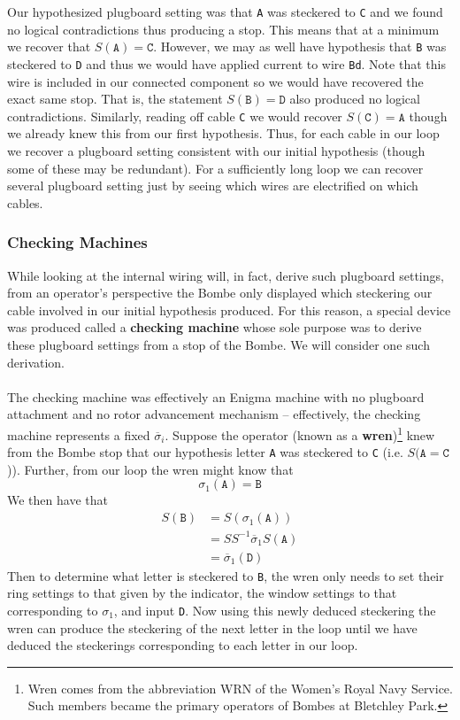 Our hypothesized plugboard setting was that \texttt{A} was steckered to \texttt{C} and we found no logical contradictions thus producing a stop. This means that at a minimum we recover that $S(\texttt{A}) = \texttt{C}$. However, we may as well have hypothesis that \texttt{B} was steckered to \texttt{D} and thus we would have applied current to wire \texttt{Bd}. Note that this wire is included in our connected component so we would have recovered the exact same stop. That is, the statement $S(\texttt{B}) = \texttt{D}$ also produced no logical contradictions. Similarly, reading off cable \texttt{C} we would recover $S(\texttt{C}) = \texttt{A}$ though we already knew this from our first hypothesis. Thus, for each cable in our loop we recover a plugboard setting consistent with our initial hypothesis (though some of these may be redundant). For a sufficiently long loop we can recover several plugboard setting just by seeing which wires are electrified on which cables.
\subsubsection{Checking Machines}
While looking at the internal wiring will, in fact, derive such plugboard settings, from an operator's perspective the Bombe only displayed which steckering our cable involved in our initial hypothesis produced. For this reason, a special device was produced called a {\bf{checking machine}} whose sole purpose was to derive these plugboard settings from a stop of the Bombe. We will consider one such derivation.
\\\\The checking machine was effectively an Enigma machine with no plugboard attachment and no rotor advancement mechanism -- effectively, the checking machine represents a fixed $\overline\sigma_i$. Suppose the operator (known as a {\bf{wren}})\footnote{Wren comes from the abbreviation WRN of the Women's Royal Navy Service. Such members became the primary operators of Bombes at Bletchley Park.} knew from the Bombe stop that our hypothesis letter \texttt{A} was steckered to \texttt{C} (i.e. $S(\texttt{A} = \texttt{C}$)). Further, from our loop the wren might know that
\[
	\sigma_1(\texttt{A}) = \texttt{B}
\]
We then have that
\begin{align*}
	S(\texttt{B}) & = S(\sigma_1(\texttt{A}))                \\
	              & = SS^{-1}\overline\sigma_1 S(\texttt{A}) \\
	              & = \overline\sigma_1(\texttt{D})
\end{align*}
Then to determine what letter is steckered to \texttt{B}, the wren only needs to set their ring settings to that given by the indicator, the window settings to that corresponding to $\sigma_1$, and input \texttt{D}. Now using this newly deduced steckering the wren can produce the steckering of the next letter in the loop until we have deduced the steckerings corresponding to each letter in our loop.

